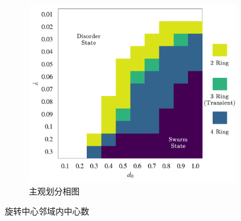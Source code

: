 \documentclass{article}
\begin{document}
\begin{figure}[H]
\begin{subfigure}[b]{0.49\textwidth}
	\end{subfigure}
	\begin{subfigure}[b]{0.49\textwidth}
		\includegraphics[width=\textwidth]{./figs/subjectiveOpRing.png}
		\vspace{-1cm}
		\caption{主观划分相图}
	\end{subfigure}
	\vspace{-0.5cm}
	\caption{旋转中心邻域内中心数}
	\label{fig:fig234c.7.1}
\end{figure}



		
\end{document}
